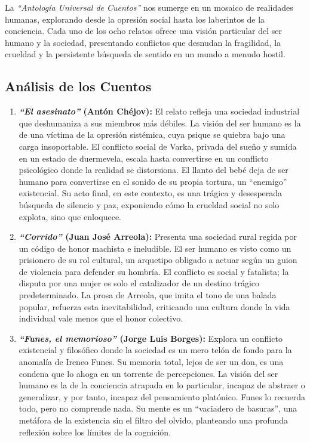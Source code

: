 \documentclass[12pt, letterpaper]{article}
\begin{document}
La \textit{``Antología Universal de Cuentos''} nos sumerge en un mosaico de realidades humanas, explorando desde la opresión social hasta los laberintos de la conciencia. Cada uno de los ocho relatos ofrece una visión particular del ser humano y la sociedad, presentando conflictos que desnudan la fragilidad, la crueldad y la persistente búsqueda de sentido en un mundo a menudo hostil.

\subsection*{Análisis de los Cuentos}
\begin{enumerate}[label=\arabic*., wide, labelindent=0pt]
	\item \textbf{\textit{``El asesinato''} (Antón Chéjov):} El relato refleja una sociedad industrial que deshumaniza a sus miembros más débiles. La visión del ser humano es la de una víctima de la opresión sistémica, cuya psique se quiebra bajo una carga insoportable. El conflicto social de Varka, privada del sueño y sumida en un estado de duermevela, escala hasta convertirse en un conflicto psicológico donde la realidad se distorsiona. El llanto del bebé deja de ser humano para convertirse en el sonido de su propia tortura, un ``enemigo'' existencial. Su acto final, en este contexto, es una trágica y desesperada búsqueda de silencio y paz, exponiendo cómo la crueldad social no solo explota, sino que enloquece.

	\item \textbf{\textit{``Corrido''} (Juan José Arreola):} Presenta una sociedad rural regida por un código de honor machista e ineludible. El ser humano es visto como un prisionero de su rol cultural, un arquetipo obligado a actuar según un guion de violencia para defender su hombría. El conflicto es social y fatalista; la disputa por una mujer es solo el catalizador de un destino trágico predeterminado. La prosa de Arreola, que imita el tono de una balada popular, refuerza esta inevitabilidad, criticando una cultura donde la vida individual vale menos que el honor colectivo.

	\item \textbf{\textit{``Funes, el memorioso''} (Jorge Luis Borges):} Explora un conflicto existencial y filosófico donde la sociedad es un mero telón de fondo para la anomalía de Ireneo Funes. Su memoria total, lejos de ser un don, es una condena que lo ahoga en un torrente de percepciones. La visión del ser humano es la de la conciencia atrapada en lo particular, incapaz de abstraer o generalizar, y por tanto, incapaz del pensamiento platónico. Funes lo recuerda todo, pero no comprende nada. Su mente es un ``vaciadero de basuras'', una metáfora de la existencia sin el filtro del olvido, planteando una profunda reflexión sobre los límites de la cognición.


\end{enumerate}
\end{document}
